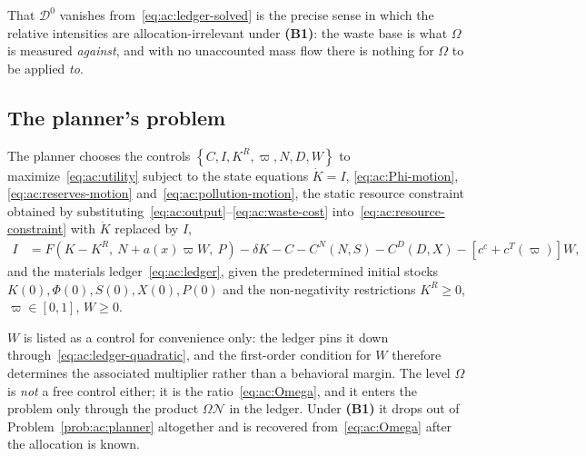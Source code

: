 That $\mathcal D^0$ vanishes from~\eqref{eq:ac:ledger-solved} is the precise sense in which the relative intensities are allocation-irrelevant under \textbf{(B1)}: the waste base is what $\Omega$ is measured \emph{against}, and with no unaccounted mass flow there is nothing for $\Omega$ to be applied \emph{to}.

\subsection{The planner's problem}
\label{subsec:ac:problem}

\begin{problem}\label{prob:ac:planner}
The planner chooses the controls $\left\{C,I,K^R,\varpi,N,D,W\right\}$ to maximize~\eqref{eq:ac:utility} subject to the state equations $\dot K=I$, \eqref{eq:ac:Phi-motion}, \eqref{eq:ac:reserves-motion} and~\eqref{eq:ac:pollution-motion}, the static resource constraint obtained by substituting~\eqref{eq:ac:output}--\eqref{eq:ac:waste-cost} into~\eqref{eq:ac:resource-constraint} with $\dot K$ replaced by $I$,
\begin{align}
I &= F\!\left(K-K^R,\ N+a\!\left(x\right)\varpi W,\ P\right)-\delta K-C-C^N(N,S)-C^D(D,X)-\left[c^c+c^T(\varpi)\right]W,
\label{eq:ac:capital-constraint}
\end{align}
and the materials ledger~\eqref{eq:ac:ledger}, given the predetermined initial stocks $K(0),\Phi(0),S(0),X(0),P(0)$ and the non-negativity restrictions $K^R\ge 0$, $\varpi\in[0,1]$, $W\ge 0$.
\end{problem}

$W$ is listed as a control for convenience only: the ledger pins it down through~\eqref{eq:ac:ledger-quadratic}, and the first-order condition for $W$ therefore determines the associated multiplier rather than a behavioral margin. The level $\Omega$ is \emph{not} a free control either; it is the ratio~\eqref{eq:ac:Omega}, and it enters the problem only through the product $\Omega\mathcal N$ in the ledger. Under \textbf{(B1)} it drops out of Problem~\ref{prob:ac:planner} altogether and is recovered from~\eqref{eq:ac:Omega} after the allocation is known.

